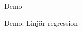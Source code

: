 \documentclass[
  11pt,
  ignorenonframetext,
  handout]{beamer}
\begin{document}
\begin{frame}{Demo}
\protect{}\label{demo-2}
\begin{block}{Demo: Linjär regression}
\protect{}\label{demo-linjuxe4r-regression}
\end{block}
\end{frame}
\end{document}

